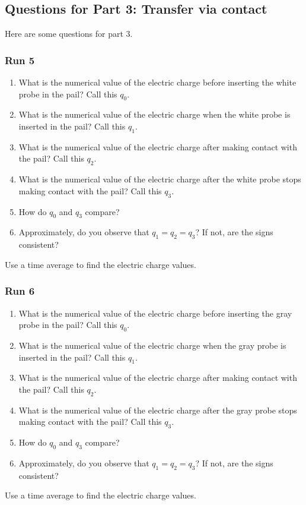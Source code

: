 \subsection{Questions for Part 3: Transfer via contact}
%
Here are some questions for part 3.
%
\subsubsection{Run 5}
%
\begin{enumerate}
	\item What is the numerical value of the electric charge before inserting the white probe in the pail? Call this $q_{0}$.
	\item What is the numerical value of the electric charge when the white probe is inserted in the pail? Call this $q_{1}$.
	\item What is the numerical value of the electric charge after making contact with the pail? Call this $q_{2}$.
	\item What is the numerical value of the electric charge after the white probe stops making contact with the pail? Call this $q_{3}$.
	\item How do $q_{0}$ and $q_{3}$ compare?
	\item Approximately, do you observe that $q_{1} = q_{2} = q_{3}$? If not, are the signs consistent?
\end{enumerate}
Use a time average to find the electric charge values.
%
\subsubsection{Run 6}
%
\begin{enumerate}
	\item What is the numerical value of the electric charge before inserting the gray probe in the pail? Call this $q_{0}$.
	\item What is the numerical value of the electric charge when the gray probe is inserted in the pail? Call this $q_{1}$.
	\item What is the numerical value of the electric charge after making contact with the pail? Call this $q_{2}$.
	\item What is the numerical value of the electric charge after the gray probe stops making contact with the pail? Call this $q_{3}$.
	\item How do $q_{0}$ and $q_{3}$ compare?
	\item Approximately, do you observe that $q_{1} = q_{2} = q_{3}$? If not, are the signs consistent?
\end{enumerate}
Use a time average to find the electric charge values.
%

